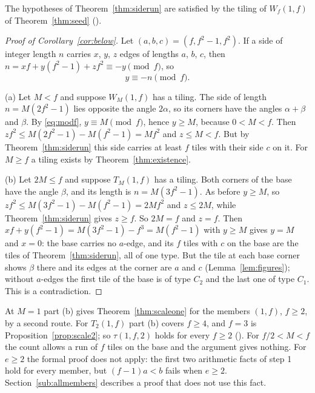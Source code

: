 \documentclass[11pt,reqno]{amsart}
\theoremstyle{plain}
\theoremstyle{definition}
\begin{document}
The hypotheses of Theorem~\ref{thm:siderun} are satisfied by the tiling of $W_f(1,f)$ of
Theorem~\ref{thm:seed} ().

\begin{proof}[Proof of Corollary~\ref{cor:below}]
Let $(a,b,c)=(f,f^2-1,f^2)$. If a side of integer length $n$ carries $x$, $y$, $z$ edges of lengths $a$,
$b$, $c$, then $n=xf+y(f^2-1)+zf^2\equiv-y\pmod f$, so
\begin{equation}\label{eq:modf}
y\equiv-n\pmod f .
\end{equation}

(a) Let $M<f$ and suppose $W_M(1,f)$ has a tiling. The side of length $n=M(2f^2-1)$ lies opposite the angle
$2\alpha$, so its corners have the angles $\alpha+\beta$ and $\beta$. By \eqref{eq:modf}, $y\equiv M\pmod f$,
hence $y\ge M$, because $0<M<f$. Then $zf^2\le M(2f^2-1)-M(f^2-1)=Mf^2$ and $z\le M<f$. But by
Theorem~\ref{thm:siderun} this side carries at least $f$ tiles with their side $c$ on it. For $M\ge f$ a
tiling exists by Theorem~\ref{thm:existence}.

(b) Let $2M\le f$ and suppose $T_M(1,f)$ has a tiling. Both corners of the base have the angle $\beta$, and
its length is $n=M(3f^2-1)$. As before $y\ge M$, so $zf^2\le M(3f^2-1)-M(f^2-1)=2Mf^2$ and $z\le2M$, while
Theorem~\ref{thm:siderun} gives $z\ge f$. So $2M=f$ and $z=f$. Then
$xf+y(f^2-1)=M(3f^2-1)-f^3=M(f^2-1)$ with $y\ge M$ gives $y=M$ and $x=0$: the base carries no $a$-edge, and
its $f$ tiles with $c$ on the base are the tiles of Theorem~\ref{thm:siderun}, all of one type. But the
tile at each base corner shows $\beta$ there and its edges at the corner are $a$ and $c$
(Lemma~\ref{lem:figures}); without $a$-edges the first tile of the base is of type $C_2$ and the last one of
type $C_1$. This is a contradiction.
\end{proof}

At $M=1$ part (b) gives Theorem~\ref{thm:scaleone} for the members $(1,f)$, $f\ge2$, by a second route. For $T_2(1,f)$ part (b) covers
$f\ge4$, and $f=3$ is Proposition~\ref{prop:scale2}; so $\tau(1,f,2)$ holds for every $f\ge2$
(). For $f/2<M<f$ the count allows a run of $f$ tiles on the base and
the argument gives nothing. For $e\ge2$ the formal proof does not apply: the first two arithmetic facts of
step 1 hold for every member, but $(f-1)a<b$ fails when $e\ge2$. Section~\ref{sub:allmembers} describes a
proof that does not use this fact.
\end{document}
